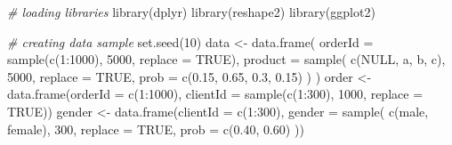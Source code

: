\documentclass[
]{book}
\newenvironment{Shaded}{\begin{snugshade}}{\end{snugshade}}
\newcommand{\AttributeTok}[1]{\textcolor[rgb]{0.77,0.63,0.00}{#1}}
\newcommand{\CommentTok}[1]{\textcolor[rgb]{0.56,0.35,0.01}{\textit{#1}}}
\newcommand{\ConstantTok}[1]{\textcolor[rgb]{0.00,0.00,0.00}{#1}}
\newcommand{\DecValTok}[1]{\textcolor[rgb]{0.00,0.00,0.81}{#1}}
\newcommand{\FloatTok}[1]{\textcolor[rgb]{0.00,0.00,0.81}{#1}}
\newcommand{\FunctionTok}[1]{\textcolor[rgb]{0.00,0.00,0.00}{#1}}
\newcommand{\NormalTok}[1]{#1}
\newcommand{\OtherTok}[1]{\textcolor[rgb]{0.56,0.35,0.01}{#1}}
\newcommand{\SpecialCharTok}[1]{\textcolor[rgb]{0.00,0.00,0.00}{#1}}
\newcommand{\StringTok}[1]{\textcolor[rgb]{0.31,0.60,0.02}{#1}}
\begin{document}
\begin{Shaded}
\begin{Highlighting}[]
\CommentTok{\# loading libraries}
\FunctionTok{library}\NormalTok{(dplyr)}
\FunctionTok{library}\NormalTok{(reshape2)}
\FunctionTok{library}\NormalTok{(ggplot2)}

\CommentTok{\# creating data sample}
\FunctionTok{set.seed}\NormalTok{(}\DecValTok{10}\NormalTok{)}
\NormalTok{data }\OtherTok{\textless{}{-}} \FunctionTok{data.frame}\NormalTok{(}
    \AttributeTok{orderId =} \FunctionTok{sample}\NormalTok{(}\FunctionTok{c}\NormalTok{(}\DecValTok{1}\SpecialCharTok{:}\DecValTok{1000}\NormalTok{), }\DecValTok{5000}\NormalTok{, }\AttributeTok{replace =} \ConstantTok{TRUE}\NormalTok{),}
    \AttributeTok{product =} \FunctionTok{sample}\NormalTok{(}
        \FunctionTok{c}\NormalTok{(}\StringTok{\textquotesingle{}NULL\textquotesingle{}}\NormalTok{, }\StringTok{\textquotesingle{}a\textquotesingle{}}\NormalTok{, }\StringTok{\textquotesingle{}b\textquotesingle{}}\NormalTok{, }\StringTok{\textquotesingle{}c\textquotesingle{}}\NormalTok{),}
        \DecValTok{5000}\NormalTok{,}
        \AttributeTok{replace =} \ConstantTok{TRUE}\NormalTok{,}
        \AttributeTok{prob =} \FunctionTok{c}\NormalTok{(}\FloatTok{0.15}\NormalTok{, }\FloatTok{0.65}\NormalTok{, }\FloatTok{0.3}\NormalTok{, }\FloatTok{0.15}\NormalTok{)}
\NormalTok{    )}
\NormalTok{)}
\NormalTok{order }\OtherTok{\textless{}{-}} \FunctionTok{data.frame}\NormalTok{(}\AttributeTok{orderId =} \FunctionTok{c}\NormalTok{(}\DecValTok{1}\SpecialCharTok{:}\DecValTok{1000}\NormalTok{),}
                    \AttributeTok{clientId =} \FunctionTok{sample}\NormalTok{(}\FunctionTok{c}\NormalTok{(}\DecValTok{1}\SpecialCharTok{:}\DecValTok{300}\NormalTok{), }\DecValTok{1000}\NormalTok{, }\AttributeTok{replace =} \ConstantTok{TRUE}\NormalTok{))}
\NormalTok{gender }\OtherTok{\textless{}{-}} \FunctionTok{data.frame}\NormalTok{(}\AttributeTok{clientId =} \FunctionTok{c}\NormalTok{(}\DecValTok{1}\SpecialCharTok{:}\DecValTok{300}\NormalTok{),}
                     \AttributeTok{gender =} \FunctionTok{sample}\NormalTok{(}
                         \FunctionTok{c}\NormalTok{(}\StringTok{\textquotesingle{}male\textquotesingle{}}\NormalTok{, }\StringTok{\textquotesingle{}female\textquotesingle{}}\NormalTok{),}
                         \DecValTok{300}\NormalTok{,}
                         \AttributeTok{replace =} \ConstantTok{TRUE}\NormalTok{,}
                         \AttributeTok{prob =} \FunctionTok{c}\NormalTok{(}\FloatTok{0.40}\NormalTok{, }\FloatTok{0.60}\NormalTok{)}
\NormalTok{                     ))}

\end{Highlighting}
\end{Shaded}
\end{document}
